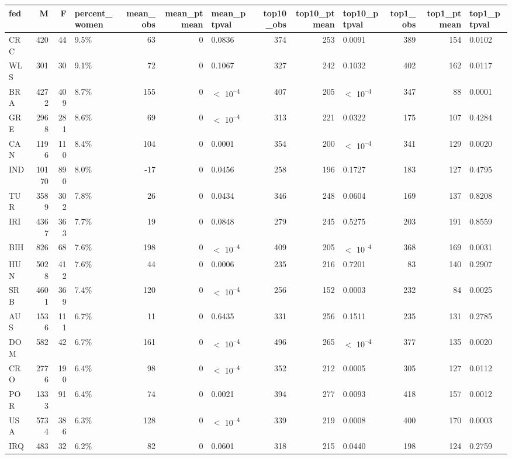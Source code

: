 
\begin{tabular}[t]{lrrlrrlrrlrrl}
\toprule
fed & M & F & percent_women & mean_obs & mean_ptmean & mean_ptpval & top10_obs & top10_ptmean & top10_ptpval & top1_obs & top1_ptmean & top1_ptpval\\
\midrule
CRC & 420 & 44 & 9.5\% & 63 & 0 & 0.0836 & 374 & 253 & 0.0091 & 389 & 154 & 0.0102\\
WLS & 301 & 30 & 9.1\% & 72 & 0 & 0.1067 & 327 & 242 & 0.1032 & 402 & 162 & 0.0117\\
BRA & 4272 & 409 & 8.7\% & 155 & 0 & $<$ 10\textsuperscript{--4} & 407 & 205 & $<$ 10\textsuperscript{--4} & 347 & 88 & 0.0001\\
GRE & 2968 & 281 & 8.6\% & 69 & 0 & $<$ 10\textsuperscript{--4} & 313 & 221 & 0.0322 & 175 & 107 & 0.4284\\
CAN & 1196 & 110 & 8.4\% & 104 & 0 & 0.0001 & 354 & 200 & $<$ 10\textsuperscript{--4} & 341 & 129 & 0.0020\\
IND & 10170 & 890 & 8.0\% & -17 & 0 & 0.0456 & 258 & 196 & 0.1727 & 183 & 127 & 0.4795\\
TUR & 3589 & 302 & 7.8\% & 26 & 0 & 0.0434 & 346 & 248 & 0.0604 & 169 & 137 & 0.8208\\
IRI & 4367 & 363 & 7.7\% & 19 & 0 & 0.0848 & 279 & 245 & 0.5275 & 203 & 191 & 0.8559\\
BIH & 826 & 68 & 7.6\% & 198 & 0 & $<$ 10\textsuperscript{--4} & 409 & 205 & $<$ 10\textsuperscript{--4} & 368 & 169 & 0.0031\\
HUN & 5028 & 412 & 7.6\% & 44 & 0 & 0.0006 & 235 & 216 & 0.7201 & 83 & 140 & 0.2907\\
SRB & 4601 & 369 & 7.4\% & 120 & 0 & $<$ 10\textsuperscript{--4} & 256 & 152 & 0.0003 & 232 & 84 & 0.0025\\
AUS & 1536 & 111 & 6.7\% & 11 & 0 & 0.6435 & 331 & 256 & 0.1511 & 235 & 131 & 0.2785\\
DOM & 582 & 42 & 6.7\% & 161 & 0 & $<$ 10\textsuperscript{--4} & 496 & 265 & $<$ 10\textsuperscript{--4} & 377 & 135 & 0.0020\\
CRO & 2776 & 190 & 6.4\% & 98 & 0 & $<$ 10\textsuperscript{--4} & 352 & 212 & 0.0005 & 305 & 127 & 0.0112\\
POR & 1333 & 91 & 6.4\% & 74 & 0 & 0.0021 & 394 & 277 & 0.0093 & 418 & 157 & 0.0012\\
USA & 5734 & 386 & 6.3\% & 128 & 0 & $<$ 10\textsuperscript{--4} & 339 & 219 & 0.0008 & 400 & 170 & 0.0003\\
IRQ & 483 & 32 & 6.2\% & 82 & 0 & 0.0601 & 318 & 215 & 0.0440 & 198 & 124 & 0.2759\\

\end{tabular}
